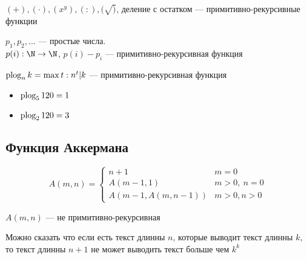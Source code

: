 \documentclass[oneside]{book}
\begin{document}
\begin{theorem}
	\((+), (\cdot), (x^y), (:), (\sqrt)\), деление с остатком --- примитивно-рекурсивные функции
	\label{orgc70046a}
\end{theorem}
\begin{lemma}
	\(p_1, p_2, \dots\) --- простые числа. \\
	\(p(i): \N \to \N\), \(p(i) - p_i\) --- примитивно-рекурсивная функция
	\label{orga1423b8}
\end{lemma}
\begin{definition}
	\(\mathop{\rm plog}_nk = \max t: n^t | k\) --- примитивно-рекурсивная функция
	\label{org7e891d4}
\end{definition}
\begin{examp}
	\-
	\begin{itemize}
		\item \(\mathop{\rm plog}_5 120 = 1\)
		\item \(\mathop{\rm plog}_2 120 = 3\)
	\end{itemize}
\end{examp}
\subsection{Функция Аккермана}
\label{sec:orgf8624ee}
\[ A(m, n) = \begin{cases}
		n + 1                 & m = 0         \\
		A(m - 1, 1)           & m > 0,\ n = 0 \\
		A(m - 1, A(m, n - 1)) & m > 0, n > 0
	\end{cases} \]
\begin{lemma}
	\(A(m, n)\) --- не примитивно-рекурсивная
\end{lemma}
Можно сказать что если есть текст длинны \(n\), которые выводит текст длинны \(k\), то текст длинны \(n + 1\) не может выводить текст больше чем \(k^k\) \fixme
\end{document}
